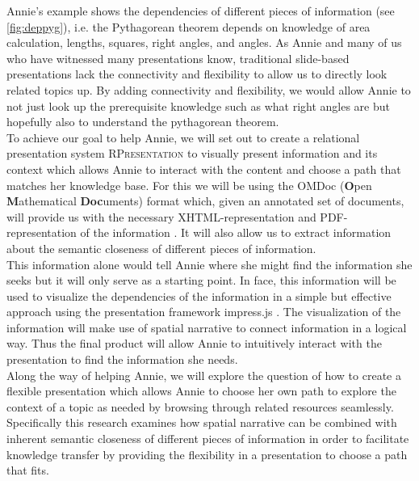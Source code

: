 \documentclass[twoside, 12pt]{article}
\newcommand{\sys}{\textsc{RPresentation}\xspace}
\begin{document}
Annie's example shows the dependencies of different pieces of information (see \autoref{fig:deppyg}), i.e. the Pythagorean theorem depends on knowledge of area calculation, lengths, squares, right angles, and angles. As Annie and many of us who have witnessed many presentations know, traditional slide-based presentations lack the connectivity and flexibility to allow us to directly look related topics up. By adding connectivity and flexibility, we would allow Annie to not just look up the prerequisite knowledge such as what right angles are but hopefully also to understand the pythagorean theorem.\\

To achieve our goal to help Annie, we will set out to create a relational presentation system \sys to visually present information and its context which allows Annie to interact with the content and choose a path that matches her knowledge base. For this we will be using the OMDoc (\textbf{O}pen \textbf{M}athematical \textbf{Doc}uments) format which, given an annotated set of documents, will provide us with the necessary XHTML-representation and PDF-representation of the information \cite{Kohlhase:OMDoc1.2}. It will also allow us to extract information about the semantic closeness of different pieces of information.\\

This information alone would tell Annie where she might find the information she seeks but it will only serve as a starting point. In face, this information will be used to visualize the dependencies of the information in a simple but effective approach using the presentation framework impress.js \cite{JSImpress:npentrel14}. The visualization of the information will make use of spatial narrative to connect information in a logical way. Thus the final product will allow Annie to intuitively interact with the presentation to find the information she needs.\\

Along the way of helping Annie, we will explore the question of how to create a flexible presentation which allows Annie to choose her own path to explore the context of a topic as needed by browsing through related resources seamlessly. Specifically this research examines how spatial narrative can be combined with inherent semantic closeness of different pieces of information in order to facilitate knowledge transfer by providing the flexibility in a presentation to choose a path that fits.\\
\end{document}
